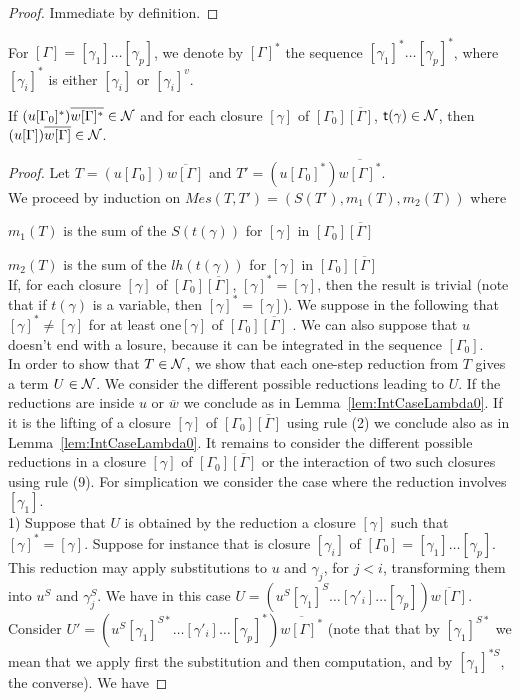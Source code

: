 \documentclass[orivec]{llncs}
\begin{document}
\begin{proof}
Immediate by definition.
\end{proof}

For $[\Gamma] = [\gamma_1] \dots[\gamma_p]$, we denote by $[\Gamma]^*$ the sequence $[\gamma_1]^* \dots[\gamma_p]^*$, where $[\gamma_i]^*$ is either $[\gamma_i]$ or $[\gamma_i]^v$.

\begin{ALlemma}\label{lem:IntCaseSharing0}
 If $(u[\Gamma_0]^*)\overline{w[\Gamma]^*} \in \mathcal{N}$ and for each closure $[\gamma]$ of $[\Gamma_0]\overline{[\Gamma]}$,  ${\mathsf{t}} (\gamma)\in\mathcal{N}$, then $(u[\Gamma])\overline{w[\Gamma]} \in \mathcal{N}$.
\end{ALlemma}

\begin{proof}

  Let $T = (u[\Gamma_0])\overline{w[\Gamma]}$ and $T' = (u[\Gamma_0]^*)\overline{w[\Gamma]^*}$.
\\
We proceed by induction on $Mes(T,T') = (S(T'), m_1(T), m_2(T))$ where

 $m_1(T)$ is the sum of the $S(t(\gamma))$ for  $[\gamma]$ in $[\Gamma_0]\overline{[\Gamma]}$

 $m_2(T)$ is the sum of the $lh(t(\gamma))$ for $[\gamma]$ in $[\Gamma_0]\overline{[\Gamma]}$
 \\
If,  for each closure $[\gamma]$ of $[\Gamma_0]\overline{[\Gamma]}$,  $[\gamma]^* = [\gamma]$, then the result is trivial (note that if $t(\gamma)$ is a variable, then  $[\gamma]^* = [\gamma]$). We suppose in the following that $[\gamma]^* \neq [\gamma]$ for at least one$[\gamma]$ of $[\Gamma_0]\overline{[\Gamma]}$ . We can also suppose that $u$ doesn't end with a losure, because it can be integrated in the sequence $[\Gamma_0]$.
\\
In order to show that $T\in\mathcal{N}$, we show that each one-step reduction from $T$ gives a term $U\in\mathcal{N}$. We consider the different possible reductions leading to $U$. If the reductions are inside $u$ or $\overline{w}$ we conclude as in Lemma~\ref{lem:IntCaseLambda0}. If it is the lifting of a closure $[\gamma]$ of $[\Gamma_0]\overline{[\Gamma]}$ using rule (2) we conclude also as in Lemma~\ref{lem:IntCaseLambda0}. It remains to consider the different possible reductions in a closure $[\gamma]$ of $[\Gamma_0]\overline{[\Gamma]}$ or the interaction of two such closures using rule (9). For simplication we consider the case where the reduction involves $[\gamma_1]$.
%
%
\medskip
\\
1) Suppose that $U$ is obtained by the reduction a closure $[\gamma]$ such that  $[\gamma]^* = [\gamma]$. Suppose for instance that is closure $[\gamma_i]$ of $[\Gamma_0] = [\gamma_1] \dots[\gamma_p]$. This reduction  may apply substitutions to $u$ and $\gamma_j$, for $j<i$, transforming them into $u^S$ and $\gamma_j^S$. We have in this case $U = (u^S[\gamma_1]^S \dots [\gamma'_i]\dots [\gamma_p])\overline{w[\Gamma]}$.
\\
Consider $U' = (u^S[\gamma_1]^{S*} \dots [\gamma'_i]\dots [\gamma_p]^*)\overline{w[\Gamma]^*}$ (note that that by $[\gamma_1]^{S*}$ we mean that we apply first the substitution and then computation, and by $[\gamma_1]^{*S}$, the converse).  We have


\end{proof}
\end{document}
